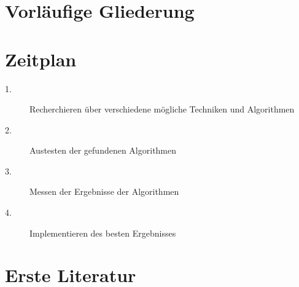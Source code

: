 \begin{onehalfspace}
\section{Vorläufige Gliederung}
\section{Zeitplan}

\begin{description}
	\item[1.]
	Recherchieren über verschiedene mögliche Techniken und Algorithmen
	\item[2.] 
	Austesten der gefundenen Algorithmen
	\item[3.]
	Messen der Ergebnisse der Algorithmen
	\item[4.] Implementieren des besten Ergebnisses
\end{description}

\section{Erste Literatur}
\end{onehalfspace}